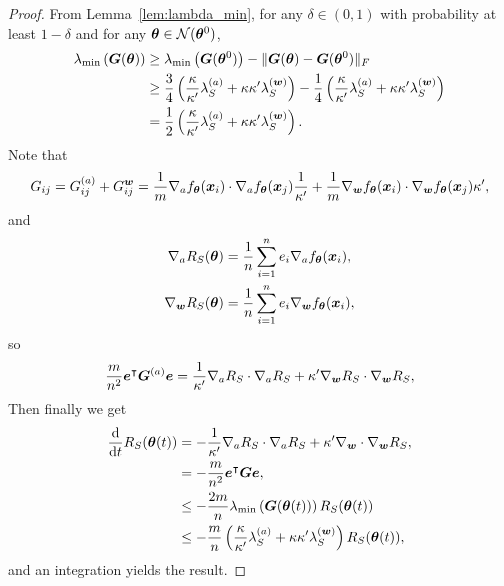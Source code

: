 \documentclass{article}
\begin{document}
\begin{proof}
    From Lemma~\ref{lem:lambda_min}, for any $\delta\in(0,1)$ with probability at least $1-\delta$ and for any $\bm{\theta}\in\mathcal{N}(\bm{\theta}^0)$,
    \begin{equation}
        \begin{aligned}
            \lambda_{\min}\left(\bm{G}(\bm{\theta})\right)
             & \geq \lambda_{\min}\left(\bm{G}(\bm{\theta}^0)\right) - \lVert\bm{G}(\bm{\theta}) - \bm{G}(\bm{\theta}^0)\rVert_F                                                                                                          \\
             & \geq \frac{3}{4}\left(\frac{\kappa}{\kappa'}\lambda_S^{(a)}+\kappa\kappa'\lambda_S^{(\bm{w})}\right) - \frac{1}{4}\left(\frac{\kappa}{\kappa'}\lambda_S^{(a)}+\kappa\kappa'\lambda_S^{(\bm{w})}\right) \\
             & = \frac{1}{2}\left(\frac{\kappa}{\kappa'}\lambda_S^{(a)}+\kappa\kappa'\lambda_S^{(\bm{w})}\right).
        \end{aligned}
    \end{equation}
    Note that
    \begin{equation}
        G_{ij} = G_{ij}^{(a)}+G^{\bm{w}}_{ij}=\frac{1}{m}\nabla_{a}f_{\bm{\theta}}(\bm{x}_i)\cdot\nabla_{a}f_{\bm{\theta}}(\bm{x}_j)\frac{1}{\kappa'}+\frac{1}{m}\nabla_{\bm{w}}f_{\bm{\theta}}(\bm{x}_i)\cdot\nabla_{\bm{w}}f_{\bm{\theta}}(\bm{x}_j)\kappa',
    \end{equation}
    and
    \begin{equation}
        \begin{aligned}
            \nabla_{a}R_S(\bm{\theta})   & =\frac{1}{n}\sum_{i=1}^{n}e_i\nabla_{a}f_{\bm{\theta}}(\bm{x}_i),    \\
            \nabla_{\bm{w}}R_S(\bm{\theta}) & = \frac{1}{n}\sum_{i=1}^{n}e_i\nabla_{\bm{w}}f_{\bm{\theta}}(\bm{x}_i),
        \end{aligned}
    \end{equation}
    so
    \begin{equation}
        \frac{m}{n^2}\bm{e}^{\intercal}\bm{G}^{(a)}\bm{e}=\frac{1}{\kappa'}\nabla_aR_S\cdot\nabla_{a}R_S+\kappa'\nabla_{\bm{w}}R_S\cdot\nabla_{\bm{w}}R_S,
    \end{equation}
    Then finally we get
    \begin{equation}
        \begin{aligned}
            \frac{\mathrm{d}}{\mathrm{d} t}R_S(\bm{\theta}(t))
             & =-\frac{1}{\kappa'}\nabla_aR_S\cdot\nabla_aR_S+\kappa'\nabla_{\bm{w}}\cdot\nabla_{\bm{w}}R_S,                            \\
             & =-\frac{m}{n^2}\bm{e}^{\intercal}\bm{G}\bm{e},                                                                                     \\
             & \leq -\frac{2m}{n}\lambda_{\min}\left(\bm{G}(\bm{\theta}(t))\right)R_S(\bm{\theta}(t))                                        \\
             & \leq -\frac{m}{n}\left(\frac{\kappa}{\kappa'}\lambda_S^{(a)}+\kappa\kappa'\lambda_S^{(\bm{w})}\right)R_S(\bm{\theta}(t)),
        \end{aligned}
    \end{equation}
    and an integration yields the result.
\end{proof}
\end{document}
